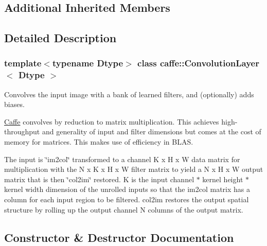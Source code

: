 \subsection*{Additional Inherited Members}


\subsection{Detailed Description}
\subsubsection*{template$<$typename Dtype$>$\newline
class caffe\+::\+Convolution\+Layer$<$ Dtype $>$}

Convolves the input image with a bank of learned filters, and (optionally) adds biases. 

\mbox{\hyperlink{classcaffe_1_1_caffe}{Caffe}} convolves by reduction to matrix multiplication. This achieves high-\/throughput and generality of input and filter dimensions but comes at the cost of memory for matrices. This makes use of efficiency in B\+L\+AS.

The input is \char`\"{}im2col\char`\"{} transformed to a channel K\textquotesingle{} x H x W data matrix for multiplication with the N x K\textquotesingle{} x H x W filter matrix to yield a N\textquotesingle{} x H x W output matrix that is then \char`\"{}col2im\char`\"{} restored. K\textquotesingle{} is the input channel $\ast$ kernel height $\ast$ kernel width dimension of the unrolled inputs so that the im2col matrix has a column for each input region to be filtered. col2im restores the output spatial structure by rolling up the output channel N\textquotesingle{} columns of the output matrix. 

\subsection{Constructor \& Destructor Documentation}
\mbox{\label{classcaffe_1_1_convolution_layer_ad27360afd7729001b9e4f1d8c8401866}} 
